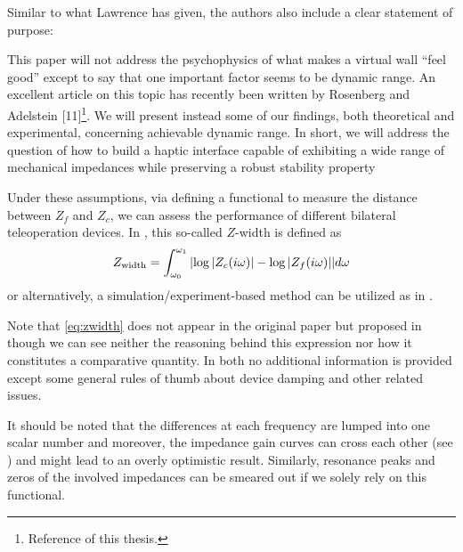 Similar to what Lawrence has given, the authors also include a clear statement of purpose: 

\begin{displayquote}
This paper will not address the psychophysics of what
makes a virtual wall \enquote{feel good} except to say that one
important factor seems to be dynamic range. An excellent
article on this topic has recently been written by
Rosenberg and Adelstein [11]\footnote{Reference \cite{rosenberg} of this thesis.}. 
We will present instead
some of our findings, both theoretical and experimental,
concerning achievable dynamic range. In short, we will
address the question of how to build a haptic interface
capable of exhibiting a wide range of mechanical
impedances while preserving a robust stability property
\end{displayquote}


Under these assumptions, via defining a functional to measure the distance between $Z_f$ and $Z_c$, we can assess the performance
of different bilateral teleoperation devices. In \cite{goranthesis}, this so-called $Z$-width is defined as 
\begin{equation}
Z_{\text{width}} = \int_{\omega_0}^{\omega_1}{\displaystyle \left|\log|Z_{\vphantom{f}c}(i\omega)|-\log |Z_f(i\omega)|\right|}d\omega
\label{eq:zwidth}
\end{equation}
or alternatively, a simulation/experiment-based method can be utilized as in \cite{weir}. 


Note that \eqref{eq:zwidth} does not appear in the original paper \cite{colgate4} but proposed in \cite{goranthesis,passenberg} 
though we can see neither the reasoning behind this expression nor how it constitutes a comparative quantity. In both 
\cite{colgate4,goranthesis} no additional information is provided except some general rules of thumb about device 
damping and other related issues. 

It should be noted that the differences at each frequency are lumped into one scalar number and moreover, the impedance 
gain curves can cross each other (see \cite{goranthesis}) and might lead to an overly optimistic result. Similarly, 
resonance peaks and zeros of the involved impedances can be smeared out if we solely rely on this functional. 

